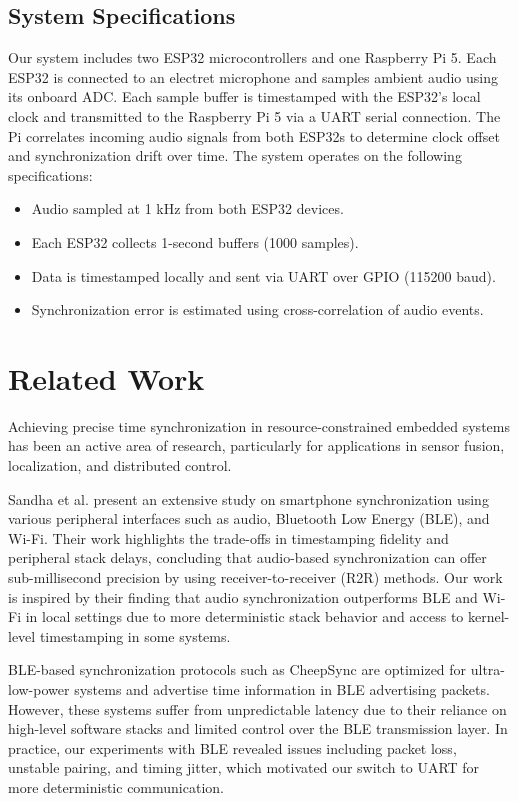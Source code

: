 \documentclass[sigconf]{acmart}
\begin{document}
\subsection{System Specifications}
Our system includes two ESP32 microcontrollers and one Raspberry Pi 5. Each ESP32 is connected to an electret microphone and samples ambient audio using its onboard ADC. Each sample buffer is timestamped with the ESP32’s local clock and transmitted to the Raspberry Pi 5 via a UART serial connection. The Pi correlates incoming audio signals from both ESP32s to determine clock offset and synchronization drift over time. The system operates on the following specifications:
\begin{itemize}
  \item Audio sampled at 1 kHz from both ESP32 devices.
  \item Each ESP32 collects 1-second buffers (1000 samples).
  \item Data is timestamped locally and sent via UART over GPIO (115200 baud).
  \item Synchronization error is estimated using cross-correlation of audio events.
\end{itemize}

\section{Related Work}
Achieving precise time synchronization in resource-constrained embedded systems has been an active area of research, particularly for applications in sensor fusion, localization, and distributed control. 

Sandha et al. \cite{sandha2019smartphone} present an extensive study on smartphone synchronization using various peripheral interfaces such as audio, Bluetooth Low Energy (BLE), and Wi-Fi. Their work highlights the trade-offs in timestamping fidelity and peripheral stack delays, concluding that audio-based synchronization can offer sub-millisecond precision by using receiver-to-receiver (R2R) methods. Our work is inspired by their finding that audio synchronization outperforms BLE and Wi-Fi in local settings due to more deterministic stack behavior and access to kernel-level timestamping in some systems.

BLE-based synchronization protocols such as CheepSync \cite{sridhar2016cheepsync} are optimized for ultra-low-power systems and advertise time information in BLE advertising packets. However, these systems suffer from unpredictable latency due to their reliance on high-level software stacks and limited control over the BLE transmission layer. In practice, our experiments with BLE revealed issues including packet loss, unstable pairing, and timing jitter, which motivated our switch to UART for more deterministic communication.
\end{document}
